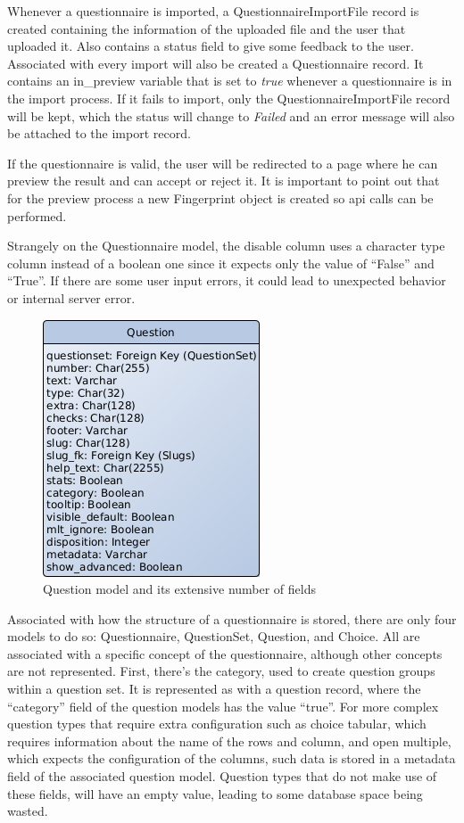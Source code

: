 Whenever a questionnaire is imported, a QuestionnaireImportFile record is created containing the information of the uploaded file and the user that uploaded it.
Also contains a status field to give some feedback to the user.
Associated with every import will also be created a Questionnaire record.
It contains an in\_preview variable that is set to \textit{true} whenever a questionnaire is in the import process.
If it fails to import, only the QuestionnaireImportFile record will be kept, which the status will change to \textit{Failed} and an error message will also be attached to the import record.

If the questionnaire is valid, the user will be redirected to a page where he can preview the result and can accept or reject it.
It is important to point out that for the preview process a new Fingerprint object is created so \gls{api} calls can be performed.

Strangely on the Questionnaire model, the disable column uses a character type column instead of a boolean one since it expects only the value of ``False'' and ``True''.
If there are some user input errors, it could lead to unexpected behavior or internal server error.


\begin{figure}
    \center
    \includegraphics[width=.4\textwidth]{question-model}
    \caption{Question model and its extensive number of fields}
    \label{fig:question-model}
\end{figure}

Associated with how the structure of a questionnaire is stored, there are only four models to do so: Questionnaire, QuestionSet, Question, and Choice.
All are associated with a specific concept of the questionnaire, although other concepts are not represented.
First, there's the category, used to create question groups within a question set.
It is represented as with a question record, where the ``category'' field of the question models has the value ``true''.
For more complex question types that require extra configuration such as choice tabular, which requires information about the name of the rows and column, and open multiple, which expects the configuration of the columns, such data is stored in a metadata field of the associated question model.
Question types that do not make use of these fields, will have an empty value, leading to some database space being wasted.

